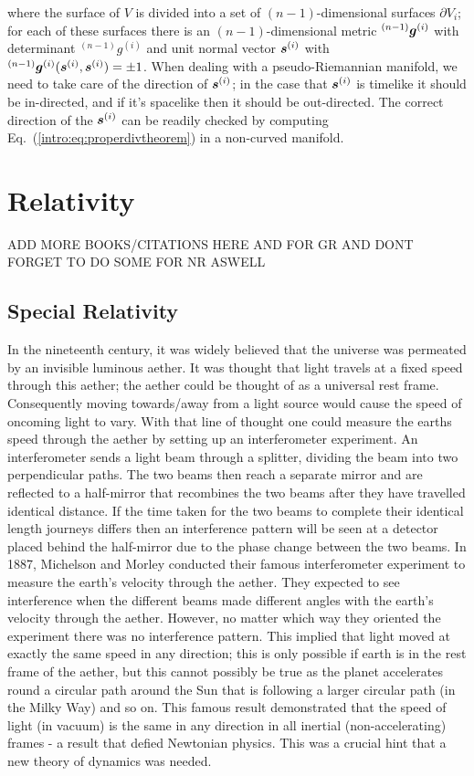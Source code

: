 where the surface of $V$ is divided into a set of $(n-1)$-dimensional surfaces $\partial V_i$; for each of these surfaces there is an $(n-1)$-dimensional metric ${}^{(n-1)}\boldsymbol{g}^{(i)}$ with determinant ${}^{(n-1)} g ^{(i)}$ and unit normal vector $\boldsymbol{s}^{(i)}$ with ${}^{(n-1)}\boldsymbol{g}^{(i)}(\boldsymbol{s}^{(i)},\boldsymbol{s}^{(i)})=\pm 1$. When dealing with a pseudo-Riemannian manifold, we need to take care of the direction of $\boldsymbol{s}^{(i)}$; in the case that $\boldsymbol{s}^{(i)}$ is timelike it should be in-directed, and if it's spacelike then it should be out-directed. The correct direction of the $\boldsymbol{s}^{(i)}$ can be readily checked by computing Eq.~(\ref{intro:eq:properdivtheorem}) in a non-curved manifold.

\newpage
\section{Relativity}

\color{gren} ADD MORE BOOKS/CITATIONS HERE AND FOR GR AND DONT FORGET TO DO SOME FOR NR ASWELL \color{black}

\subsection{Special Relativity}

In the nineteenth century, it was widely believed that the universe was permeated by an invisible luminous aether. It was thought that light travels at a fixed speed through this aether; the aether could be thought of as a universal rest frame. Consequently moving towards/away from a light source would cause the speed of oncoming light to vary. With that line of thought one could measure the earths speed through the aether by setting up an interferometer experiment. An interferometer sends a light beam through a splitter, dividing the beam into two perpendicular paths. The two beams then reach a separate mirror and are reflected to a half-mirror that recombines the two beams after they have travelled identical distance. If the time taken for the two beams to complete their identical length journeys differs then an interference pattern will be seen at a detector placed behind the half-mirror due to the phase change between the two beams. In 1887, Michelson and Morley conducted their famous interferometer experiment to measure the earth's velocity through the aether. They expected to see interference when the different beams made different angles with the earth's velocity through the aether. However, no matter which way they oriented the experiment there was no interference pattern. This implied that light moved at exactly the same speed in any direction; this is only possible if earth is in the rest frame of the aether, but this cannot possibly be true as the planet accelerates round a circular path around the Sun that is following a larger circular path (in the Milky Way) and so on. This famous result demonstrated that the speed of light (in vacuum) is the same in any direction in all inertial (non-accelerating) frames - a result that defied Newtonian physics. This was a crucial hint that a new theory of dynamics was needed.

